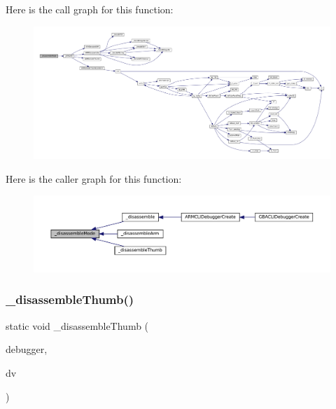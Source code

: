 Here is the call graph for this function\+:
\nopagebreak
\begin{figure}[H]
\begin{center}
\leavevmode
\includegraphics[width=350pt]{arm_2debugger_2cli-debugger_8c_a0ff9ed2f86427256fde0a97dafb94b3c_cgraph}
\end{center}
\end{figure}
Here is the caller graph for this function\+:
\nopagebreak
\begin{figure}[H]
\begin{center}
\leavevmode
\includegraphics[width=350pt]{arm_2debugger_2cli-debugger_8c_a0ff9ed2f86427256fde0a97dafb94b3c_icgraph}
\end{center}
\end{figure}
\mbox{\label{arm_2debugger_2cli-debugger_8c_ae4976961ac2fc2199fc3fd2ad59f368c}} 
\subsubsection{\texorpdfstring{\+\_\+disassemble\+Thumb()}{\_disassembleThumb()}}
{\footnotesize\ttfamily static void \+\_\+disassemble\+Thumb (\begin{DoxyParamCaption}\item[{struct C\+L\+I\+Debugger $\ast$}]{debugger,  }\item[{struct C\+L\+I\+Debug\+Vector $\ast$}]{dv }\end{DoxyParamCaption})\hspace{0.3cm}{\ttfamily [static]}}

